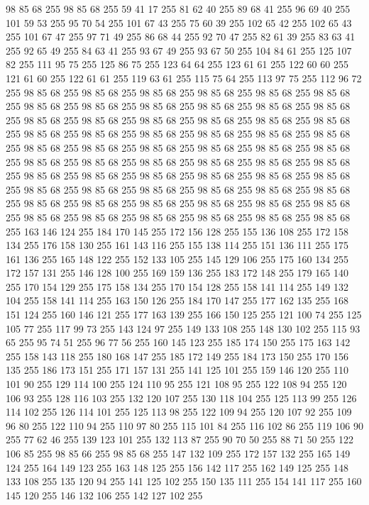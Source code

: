 98 85 68 255 98 85 68 255 59 41 17 255 81 62 40 255 89 68 41 255 96 69 40 255 101 59 53 255 95 70 54 255 101 67 43 255 75 60 39 255 102 65 42 255 102 65 43 255 101 67 47 255 97 71 49 255 86 68 44 255 92 70 47 255 82 61 39 255 83 63 41 255 92 65 49 255 84 63 41 255 93 67 49 255 93 67 50 255 104 84 61 255 125 107 82 255 111 95 75 255 125 86 75 255 123 64 64 255 123 61 61 255 122 60 60 255 121 61 60 255 122 61 61 255 119 63 61 255 115 75 64 255 113 97 75 255 112 96 72 255 98 85 68 255 98 85 68 255 98 85 68 255 98 85 68 255 98 85 68 255 98 85 68 255 98 85 68 255 98 85 68 255 98 85 68 255 98 85 68 255 98 85 68 255 98 85 68 255 98 85 68 255 98 85 68 255 98 85 68 255 98 85 68 255 98 85 68 255 98 85 68 255 98 85 68 255 98 85 68 255 98 85 68 255 98 85 68 255 98 85 68 255 98 85 68 255 98 85 68 255 98 85 68 255 98 85 68 255 98 85 68 255 98 85 68 255
98 85 68 255 98 85 68 255 98 85 68 255 98 85 68 255 98 85 68 255 98 85 68 255 98 85 68 255 98 85 68 255 98 85 68 255 98 85 68 255 98 85 68 255 98 85 68 255 98 85 68 255 98 85 68 255 98 85 68 255 98 85 68 255 98 85 68 255 98 85 68 255 98 85 68 255 98 85 68 255 98 85 68 255 98 85 68 255 98 85 68 255 98 85 68 255 98 85 68 255 98 85 68 255 98 85 68 255 98 85 68 255 98 85 68 255 98 85 68 255 98 85 68 255 163 146 124 255 184 170 145 255 172 156 128 255 155 136 108 255 172 158 134 255 176 158 130 255 161 143 116 255 155 138 114 255 151 136 111 255 175 161 136 255 165 148 122 255 152 133 105 255 145 129 106 255 175 160 134 255 172 157 131 255 146 128 100 255 169 159 136 255 183 172 148 255 179 165 140 255 170 154 129 255 175 158 134 255 170 154 128 255 158 141 114 255 149 132 104 255 158 141 114 255 163 150 126 255 184 170 147 255 177 162 135 255 168 151 124 255 160 146 121 255 177 163 139 255 166 150 125 255 121 100 74 255
125 105 77 255 117 99 73 255 143 124 97 255 149 133 108 255 148 130 102 255 115 93 65 255 95 74 51 255 96 77 56 255 160 145 123 255 185 174 150 255 175 163 142 255 158 143 118 255 180 168 147 255 185 172 149 255 184 173 150 255 170 156 135 255 186 173 151 255 171 157 131 255 141 125 101 255 159 146 120 255 110 101 90 255 129 114 100 255 124 110 95 255 121 108 95 255 122 108 94 255 120 106 93 255 128 116 103 255 132 120 107 255 130 118 104 255 125 113 99 255 126 114 102 255 126 114 101 255 125 113 98 255 122 109 94 255 120 107 92 255 109 96 80 255 122 110 94 255 110 97 80 255 115 101 84 255 116 102 86 255 119 106 90 255 77 62 46 255 139 123 101 255 132 113 87 255 90 70 50 255 88 71 50 255 122 106 85 255 98 85 66 255 98 85 68 255 147 132 109 255 172 157 132 255 165 149 124 255 164 149 123 255 163 148 125 255 156 142 117 255 162 149 125 255 148 133 108 255 135 120 94 255 141 125 102 255 150 135 111 255 154 141 117 255 160 145 120 255 146 132 106 255 142 127 102 255
